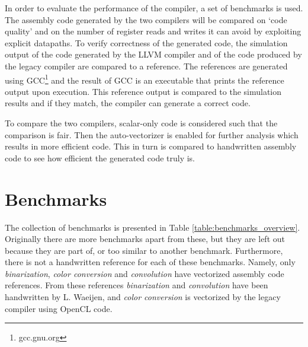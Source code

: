 
In order to evaluate the performance of the compiler, a set of benchmarks is used. The assembly code generated by the two compilers will be compared on `code quality' and on the number of register reads and writes it can avoid by exploiting explicit datapaths. To verify correctness of the generated code, the simulation output of the code generated by the LLVM compiler and of the code produced by the legacy compiler are compared to a reference. The references are generated using GCC\footnote{gcc.gnu.org} and the result of GCC is an executable that prints the reference output upon execution. This reference output is compared to the simulation results and if they match, the compiler can generate a correct code.

To compare the two compilers, scalar-only code is considered such that the comparison is fair. Then the auto-vectorizer is enabled for further analysis which results in more efficient code. This in turn is compared to handwritten assembly code to see how efficient the generated code truly is.

\section{Benchmarks}
The collection of benchmarks is presented in Table \ref{table:benchmarks_overview}. Originally there are more benchmarks apart from these, but they are left out because they are part of, or too similar to another benchmark. Furthermore, there is not a handwritten reference for each of these benchmarks. Namely, only \emph{binarization}, \emph{color conversion} and \emph{convolution} have vectorized assembly code references. From these references \emph{binarization} and \emph{convolution} have been handwritten by L. Waeijen, and \emph{color conversion} is vectorized by the legacy compiler using OpenCL code.

